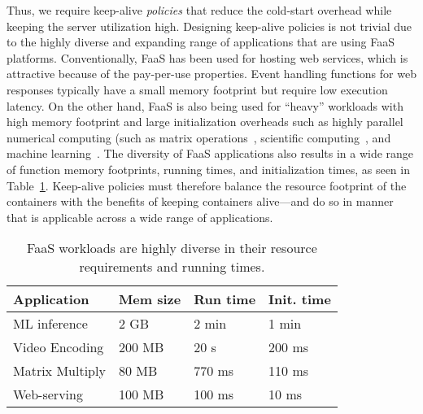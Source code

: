 Thus, we require keep-alive \emph{policies} that reduce the cold-start overhead while keeping the server utilization high. 
Designing keep-alive policies is not trivial due to the highly diverse and expanding range of applications that are using FaaS platforms. 
Conventionally, FaaS has been used for hosting web services, which is attractive because of the pay-per-use properties. 
Event handling functions for web responses typically have a small memory footprint but require low execution latency. 
On the other hand, FaaS is also being used for ``heavy'' workloads with high memory footprint and large initialization overheads such as highly parallel numerical computing (such as matrix operations~\cite{jonas2017occupy}, scientific computing~\cite{shankar2018numpywren}, and machine learning~\cite{akkus_sand_2018}.
%
The diversity of FaaS applications also results in a wide range of function memory footprints, running times, and initialization times, as seen in Table~\ref{tab:workloads}. 
%
Keep-alive policies must therefore balance the resource footprint of the containers with the benefits of keeping containers alive---and do so in manner that is applicable across a wide range of applications. 


\begin{table}
  \label{tab:workloads}
  \begin{tabular}{llll}
    \hline 
    Application & Mem size & Run time & Init. time \\
    \hline
    ML inference & 2 GB & 2 min & 1 min \\
    Video Encoding & 200 MB & 20 s & 200 ms \\
    Matrix Multiply & 80 MB & 770 ms & 110 ms \\
    Web-serving & 100 MB & 100 ms & 10 ms \\

    \hline
  \end{tabular}
  \caption{FaaS workloads are highly diverse in their resource requirements and running times.} 
  \vspace*{\myfigspace}
  \vspace*{\myfigspace}
  \vspace*{\myfigspace}
\end{table}















